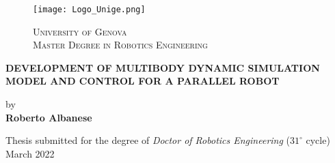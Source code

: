 
\thispagestyle{empty}
\begin{figure}[h!]
 \centering
 \texttt{[image: Logo\_Unige.png]} %
	\begin{center} 
		\Large
		{\textsc{University of Genova}}\\
		  \vspace{0.5em}
		  \large
	         \textsc{Master Degree in Robotics Engineering}\\

	\end{center}
\end{figure}



\begin{center} 
	


		\LARGE
		\textbf{DEVELOPMENT OF MULTIBODY DYNAMIC SIMULATION MODEL AND CONTROL FOR A PARALLEL ROBOT} \\
\end{center}

 	\begin{center} 
		by \\
		\vspace{0.5em}
		\textbf{Roberto Albanese}\\
		\vspace{1em}
	
		
	\vspace{1cm}	
		\normalsize
		Thesis submitted for the degree of \textit{Doctor of Robotics Engineering} ($31^\circ$ cycle) \\
	\vspace{1cm}	
		\normalsize
		March 2022\\ 
	\end{center}
	\vspace{1em}

